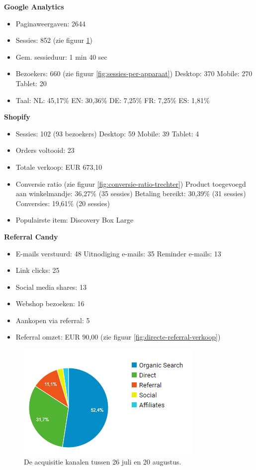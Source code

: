 \textbf{Google Analytics}
\begin{itemize}
	\item Paginaweergaven: 2644	
	\item Sessies: 852 (zie figuur \ref{fig:acquisitie-kanalen})
	\item Gem. sessieduur: 1 min 40 sec
	\item Bezoekers: 660 (zie figuur \ref{fig:sessies-per-apparaat})
		\subitem Desktop: 370
		\subitem Mobile: 270
		\subitem Tablet: 20
	\item Taal:
		\subitem NL: 45,17\%
		\subitem EN: 30,36\%
		\subitem DE: 7,25\%
		\subitem FR: 7,25\%
		\subitem ES: 1,81\%
\end{itemize}
\textbf{Shopify}
\begin{itemize}
	\item Sessies: 102 (93 bezoekers)
		\subitem Desktop: 59
		\subitem Mobile: 39
		\subitem Tablet: 4
	\item Orders voltooid: 23
	\item Totale verkoop: EUR 673,10
	\item Conversie ratio  (zie figuur \ref{fig:conversie-ratio-trechter})
		\subitem Product toegevoegd aan winkelmandje: 36,27\% (35 sessies)
		\subitem Betaling bereikt: 30,39\% (31 sessies)
		\subitem Conversies: 19,61\% (20 sessies)
	\item Populairste item: Discovery Box Large
\end{itemize}
\textbf{Referral Candy}
\begin{itemize}
	\item E-mails verstuurd: 48 
		\subitem Uitnodiging e-mails: 35
		\subitem Reminder e-mails: 13 
	\item Link clicks: 25
	\item Social media shares: 13
	\item Webshop bezoeken: 16
	\item Aankopen via referral: 5
	\item Referral omzet: EUR 90,00 (zie figuur \ref{fig:directe-referral-verkoop})
\end{itemize}

\begin{figure}
	\includegraphics[]{img/acquisitie-kanalen.png}
	\centering
	\caption{De acquisitie kanalen tussen 26 juli en 20 augustus.}
	\label{fig:acquisitie-kanalen}
\end{figure}


